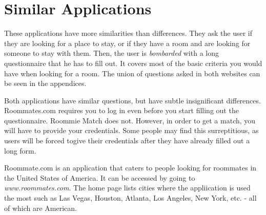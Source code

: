 \documentclass[journal]{./IEEE/IEEEtran}
\begin{document}
\section{Similar Applications}
\pubidadjcol
These applications have more similarities than differences. They ask the user if they are looking for a place to stay, or if they have a room and are looking for someone to stay with them. Then, the user is \textit{bombarded} with a long questionnaire that he has to fill out. It covers most of the basic criteria you would have when looking for a room. The union of questions asked in both websites can be seen in the appendices.

Both applications have similar questions, but have subtle insignificant differences. Roommates.com requires you to log in even before you start filling out the questionnaire. Roommie Match does not. However, in order to get a match, you will have to provide your credentials. Some people may find this surreptitious, as users will be forced togive their credentials after they have already filled out a long form.

Roommate.com\cite{roommate.com} is an application that caters to people looking for roommates in the United States of America. It can be accessed by going to \textit{www.roommates.com}. The home page lists cities where the appliication is used the most such as Las Vegas, Houston, Atlanta, Los Angeles, New York, etc. - all of which are American.
\end{document}
